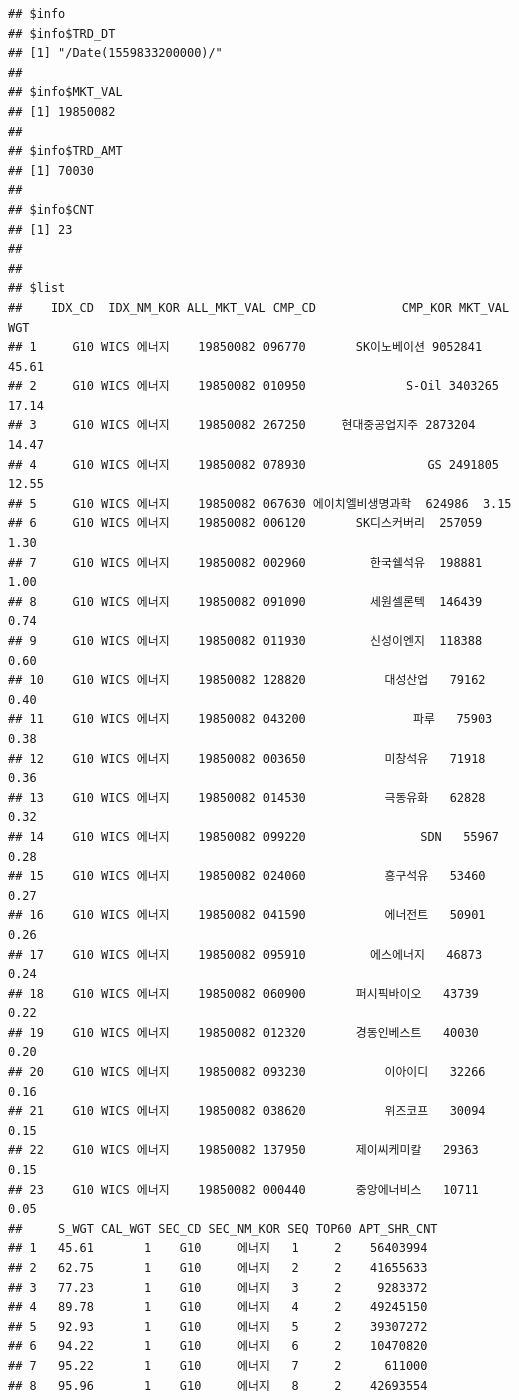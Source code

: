 \documentclass[]{book}
\begin{document}
\begin{verbatim}
## $info
## $info$TRD_DT
## [1] "/Date(1559833200000)/"
## 
## $info$MKT_VAL
## [1] 19850082
## 
## $info$TRD_AMT
## [1] 70030
## 
## $info$CNT
## [1] 23
## 
## 
## $list
##    IDX_CD  IDX_NM_KOR ALL_MKT_VAL CMP_CD            CMP_KOR MKT_VAL   WGT
## 1     G10 WICS 에너지    19850082 096770       SK이노베이션 9052841 45.61
## 2     G10 WICS 에너지    19850082 010950              S-Oil 3403265 17.14
## 3     G10 WICS 에너지    19850082 267250     현대중공업지주 2873204 14.47
## 4     G10 WICS 에너지    19850082 078930                 GS 2491805 12.55
## 5     G10 WICS 에너지    19850082 067630 에이치엘비생명과학  624986  3.15
## 6     G10 WICS 에너지    19850082 006120       SK디스커버리  257059  1.30
## 7     G10 WICS 에너지    19850082 002960         한국쉘석유  198881  1.00
## 8     G10 WICS 에너지    19850082 091090         세원셀론텍  146439  0.74
## 9     G10 WICS 에너지    19850082 011930         신성이엔지  118388  0.60
## 10    G10 WICS 에너지    19850082 128820           대성산업   79162  0.40
## 11    G10 WICS 에너지    19850082 043200               파루   75903  0.38
## 12    G10 WICS 에너지    19850082 003650           미창석유   71918  0.36
## 13    G10 WICS 에너지    19850082 014530           극동유화   62828  0.32
## 14    G10 WICS 에너지    19850082 099220                SDN   55967  0.28
## 15    G10 WICS 에너지    19850082 024060           흥구석유   53460  0.27
## 16    G10 WICS 에너지    19850082 041590           에너전트   50901  0.26
## 17    G10 WICS 에너지    19850082 095910         에스에너지   46873  0.24
## 18    G10 WICS 에너지    19850082 060900       퍼시픽바이오   43739  0.22
## 19    G10 WICS 에너지    19850082 012320       경동인베스트   40030  0.20
## 20    G10 WICS 에너지    19850082 093230           이아이디   32266  0.16
## 21    G10 WICS 에너지    19850082 038620           위즈코프   30094  0.15
## 22    G10 WICS 에너지    19850082 137950       제이씨케미칼   29363  0.15
## 23    G10 WICS 에너지    19850082 000440       중앙에너비스   10711  0.05
##     S_WGT CAL_WGT SEC_CD SEC_NM_KOR SEQ TOP60 APT_SHR_CNT
## 1   45.61       1    G10     에너지   1     2    56403994
## 2   62.75       1    G10     에너지   2     2    41655633
## 3   77.23       1    G10     에너지   3     2     9283372
## 4   89.78       1    G10     에너지   4     2    49245150
## 5   92.93       1    G10     에너지   5     2    39307272
## 6   94.22       1    G10     에너지   6     2    10470820
## 7   95.22       1    G10     에너지   7     2      611000
## 8   95.96       1    G10     에너지   8     2    42693554

\end{verbatim}
\end{document}
